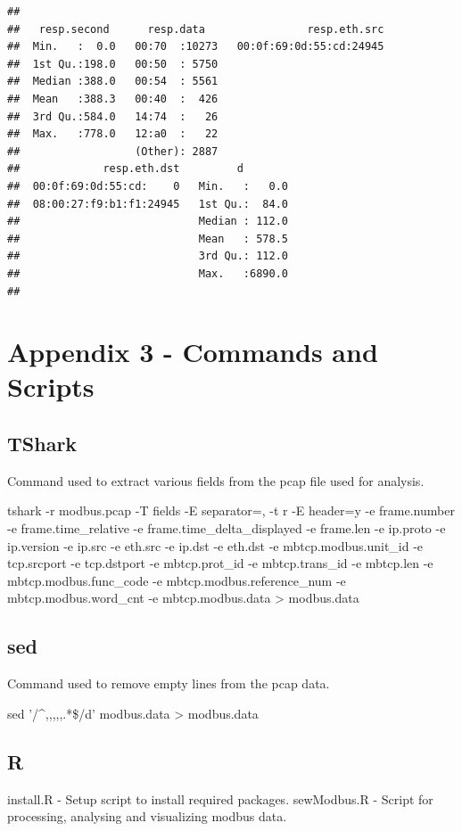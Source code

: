 \documentclass[]{article}
\begin{document}
\begin{verbatim}
##                                                                        
##   resp.second      resp.data                resp.eth.src  
##  Min.   :  0.0   00:70  :10273   00:0f:69:0d:55:cd:24945  
##  1st Qu.:198.0   00:50  : 5750                            
##  Median :388.0   00:54  : 5561                            
##  Mean   :388.3   00:40  :  426                            
##  3rd Qu.:584.0   14:74  :   26                            
##  Max.   :778.0   12:a0  :   22                            
##                  (Other): 2887                            
##             resp.eth.dst         d         
##  00:0f:69:0d:55:cd:    0   Min.   :   0.0  
##  08:00:27:f9:b1:f1:24945   1st Qu.:  84.0  
##                            Median : 112.0  
##                            Mean   : 578.5  
##                            3rd Qu.: 112.0  
##                            Max.   :6890.0  
## 
\end{verbatim}

\pagebreak

\section{Appendix 3 - Commands and
Scripts}\label{appendix-3---commands-and-scripts}

\subsection{TShark}\label{tshark}

Command used to extract various fields from the pcap file used for
analysis.

tshark -r modbus.pcap -T fields -E separator=, -t r -E header=y -e
frame.number -e frame.time\_relative -e frame.time\_delta\_displayed -e
frame.len -e ip.proto -e ip.version -e ip.src -e eth.src -e ip.dst -e
eth.dst -e mbtcp.modbus.unit\_id -e tcp.srcport -e tcp.dstport -e
mbtcp.prot\_id -e mbtcp.trans\_id -e mbtcp.len -e
mbtcp.modbus.func\_code -e mbtcp.modbus.reference\_num -e
mbtcp.modbus.word\_cnt -e mbtcp.modbus.data \textgreater{} modbus.data

\subsection{sed}\label{sed}

Command used to remove empty lines from the pcap data.

sed '/\^{},,,,,.*\$/d' modbus.data \textgreater{} modbus.data

\subsection{R}\label{r}

install.R - Setup script to install required packages. sewModbus.R -
Script for processing, analysing and visualizing modbus data.
\end{document}
